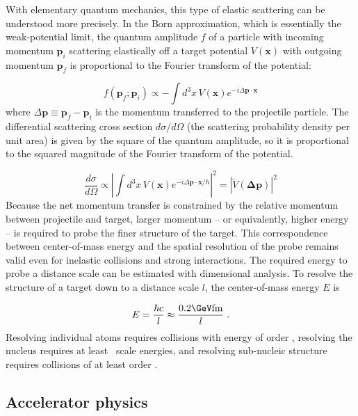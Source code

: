 With elementary quantum mechanics, this type of elastic scattering can be understood more precisely.
In the Born approximation, which is essentially the weak-potential limit, the quantum amplitude $f$ of a particle with incoming momentum $\mathbf{p}_{i}$ scattering elastically off a target potential $V(\mathbf{x})$ with outgoing momentum $\mathbf{p}_{f}$ is proportional to the Fourier transform of the potential:

\begin{equation}
  f\left(\mathbf{p}_f ; \mathbf{p}_i\right) \propto - \int d^3 x \, V(\mathbf{x}) e^{-i \Delta \mathbf{p} \cdot \mathbf{x}}
  \label{eq:born}
\end{equation}
where $\Delta \mathbf{p} \equiv \mathbf{p}_f - \mathbf{p}_i$ is the momentum transferred to the projectile particle.
The differential scattering cross section $d\sigma/d\Omega$ (the scattering probability density per unit area) is given by the square of the quantum amplitude, so it is proportional to the squared magnitude of the Fourier transform of the potential.

\begin{equation}
  \frac{d\sigma}{d\Omega} \propto \left| \int d^3 x \, V(\mathbf{x}) e^{-i \Delta \mathbf{p} \cdot \mathbf{x} / \hbar} \right|^2 = \left| \tilde{V}(\mathbf{\Delta \mathbf{p}}) \right|^2
\end{equation}
Because the net momentum transfer is constrained by the relative momentum between projectile and target, larger momentum -- or equivalently, higher energy -- is required to probe the finer structure of the target.
This correspondence between center-of-mass energy and the spatial resolution of the probe remains valid even for inelastic collisions and strong interactions.
The required energy to probe a distance scale can be estimated with dimensional analysis.
To resolve the structure of a target down to a distance scale $l$, the center-of-mass energy $E$ is

\begin{equation}
E = \frac{\hbar c}{l} \approx \frac{0.2 \GeV \fm}{l} \; .
\end{equation}
Resolving individual atoms requires collisions with energy of order \keV, resolving the nucleus requires at least \MeV\ scale energies, and resolving sub-nucleic structure requires collisions of at least order \GeV.

\subsection{Accelerator physics}

